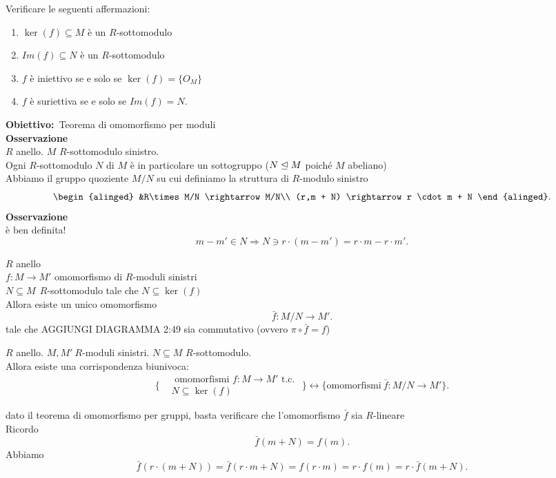 \documentclass[12px]{article}
\begin{document}
  Verificare le seguenti affermazioni:
  \begin{enumerate}
	  \item $\ker(f)\subseteq M$ è un $R$-sottomodulo
	  \item $Im(f)\subseteq N$ è un  $R$-sottomodulo
	  \item $f$ è iniettivo se e solo se $\ker(f) = \{O_M\}$
	  \item  $f$ è suriettiva se e solo se $Im(f) = N$.
  \end{enumerate}
  \textbf{Obiettivo:}\
  Teorema di omomorfismo per moduli\\
  \textbf{Osservazione}\\
  $R$ anello. $M$ $R$-sottomodulo sinistro.\\
  Ogni $R$-sottomodulo $N$ di  $M$ è in particolare un sottogruppo ($N\trianglelefteq M$ poiché $M$ abeliano)\\
  Abbiamo il gruppo quoziente $M/N$ su cui definiamo la struttura di  $R$-modulo sinistro
  \[
  \begin{alinged}
	&R\times M/N \rightarrow M/N\\
	(r,m + N) \rightarrow r \cdot m + N
  \end{alinged}
  .\]
  \textbf{Osservazione}\\
  è ben definita!
  \[
  m - m'\in N \Rightarrow N\ni r\cdot (m-m') = r\cdot m - r\cdot m' 
  .\]
  \begin{teo}[di omomorfismi]
  	$R$ anello\\
	$f: M \rightarrow M'$ omomorfismo di $R$-moduli sinistri\\
	$N\subseteq M\ \ R$-sottomodulo tale che $N\subseteq \ker(f)$\\
	Allora  esiste un unico omomorfismo 
	\[
	\bar f :M/N \rightarrow M'
	.\] 
	tale che  AGGIUNGI DIAGRAMMA 2:49 sia commutativo (ovvero $\pi\circ \bar f = f$)
  \end{teo}
  \begin{coro}
  	$R$ anello. $M,M'\ R$-moduli sinistri. $N\subseteq M$ $R$-sottomodulo.\\
	Allora esiste una corrispondenza biunivoca:
	 \[
		 \bigg\lbrace \begin{aligned}
			 &\text{ omomorfismi } f: M \rightarrow M' \text { t.c. }\\ &N\subseteq \ker(f)
		 \end{aligned}\bigg\rbrace\leftrightarrow \{\text{omomorfismi} \ \bar f : M/N \rightarrow M'\}
	.\] 
  \end{coro}
  \begin{dimo}
  	dato il teorema di omomorfismo per gruppi, basta verificare che l'omomorfismo $\bar f$ sia $R$-lineare\\
	Ricordo
	\[
	\bar f(m + N) = f(m)
	.\] 
	Abbiamo
	\[
	\bar f(r\cdot (m + N)) = \bar f(r\cdot m + N) = f(r\cdot m) = r\cdot f(m) = r\cdot \bar f(m + N)
	.\] 
  \end{dimo}
\end{document}
